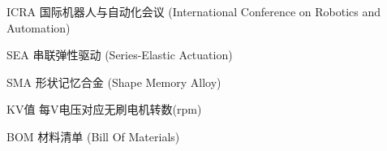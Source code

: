 
\begin{denotation}[3cm]
\item[ICRA] 国际机器人与自动化会议 (International Conference on Robotics and Automation)
\item[SEA] 串联弹性驱动 (Series-Elastic Actuation)
\item[SMA] 形状记忆合金 (Shape Memory Alloy)
\item[KV值] 每V电压对应无刷电机转数(rpm)
\item[BOM] 材料清单 (Bill Of Materials) 
\end{denotation}
 

